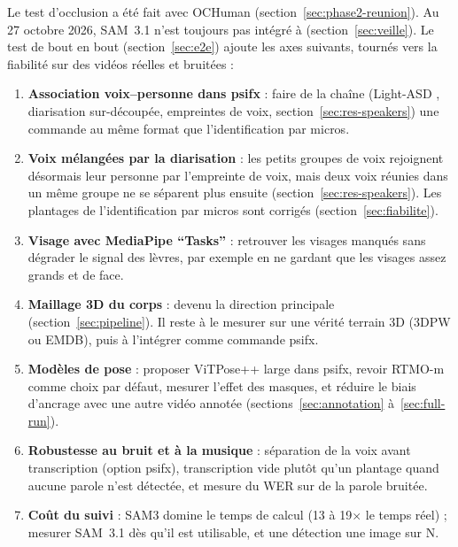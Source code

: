 \documentclass[11pt,a4paper]{report}
\newcommand{\code}[1]{\texttt{\detokenize{#1}}}
\begin{document}
Le test d'occlusion a été fait avec OCHuman (section~\ref{sec:phase2-reunion}). Au 27 octobre 2026, SAM~3.1 n'est
toujours pas intégré à \code{transformers} (section~\ref{sec:veille}). Le test de bout en bout
(section~\ref{sec:e2e}) ajoute les axes suivants, tournés vers la fiabilité sur des vidéos réelles et bruitées :
\begin{enumerate}[resume]
    \item \textbf{Association voix--personne dans psifx} : faire de la chaîne \code{speakers.py} (Light-ASD
    \cite{liao2023lightasd}, diarisation sur-découpée, empreintes de voix, section~\ref{sec:res-speakers}) une commande au même
    format que l'identification par micros.
    \item \textbf{Voix mélangées par la diarisation} : les petits groupes de voix rejoignent désormais leur personne par l'empreinte
    de voix, mais deux voix réunies dans un même groupe ne se séparent plus ensuite (section~\ref{sec:res-speakers}). Les plantages
    de l'identification par micros sont corrigés (section~\ref{sec:fiabilite}).
    \item \textbf{Visage avec MediaPipe \enquote{Tasks}} : retrouver les visages manqués sans dégrader le signal des
    lèvres, par exemple en ne gardant que les visages assez grands et de face.
    \item \textbf{Maillage 3D du corps} : devenu la direction principale (section~\ref{sec:pipeline}). Il reste à le mesurer
    sur une vérité terrain 3D (3DPW ou EMDB), puis à l'intégrer comme commande psifx.
    \item \textbf{Modèles de pose} : proposer ViTPose++ large dans psifx, revoir RTMO-m comme choix par défaut, mesurer l'effet
    des masques, et réduire le biais d'ancrage avec une autre vidéo annotée (sections~\ref{sec:annotation} à~\ref{sec:full-run}).
    \item \textbf{Robustesse au bruit et à la musique} : séparation de la voix avant transcription (option psifx),
    transcription vide plutôt qu'un plantage quand aucune parole n'est détectée, et mesure du WER sur de la parole
    bruitée.
    \item \textbf{Coût du suivi} : SAM3 domine le temps de calcul (13 à 19$\times$ le temps réel) ; mesurer
    SAM~3.1 dès qu'il est utilisable, et une détection une image sur N.
\end{enumerate}
\end{document}
